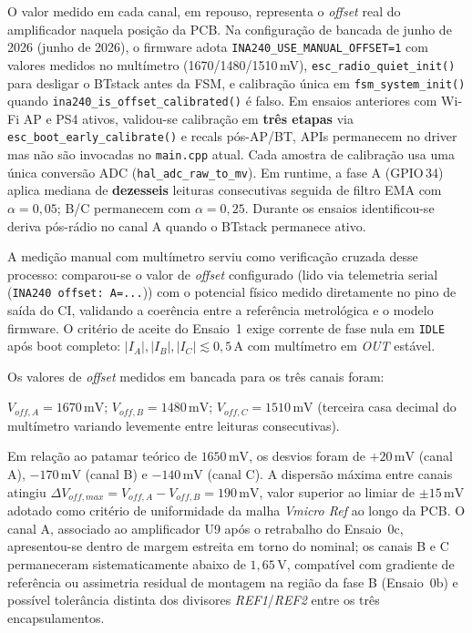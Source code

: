O valor medido em cada canal, em repouso, representa o \textit{offset} real do amplificador naquela posição da PCB. Na configuração de bancada de junho de 2026 (junho de 2026), o firmware adota \texttt{INA240\_USE\_MANUAL\_OFFSET=1} com valores medidos no multímetro (1670/1480/1510\,mV), \texttt{esc\_radio\_quiet\_init()} para desligar o BTstack antes da FSM, e calibração única em \texttt{fsm\_system\_init()} quando \texttt{ina240\_is\_offset\_calibrated()} é falso. Em ensaios anteriores com Wi-Fi AP e PS4 ativos, validou-se calibração em \textbf{três etapas} via \texttt{esc\_boot\_early\_calibrate()} e recals pós-AP/BT, APIs permanecem no driver mas não são invocadas no \texttt{main.cpp} atual. Cada amostra de calibração usa uma única conversão ADC (\texttt{hal\_adc\_raw\_to\_mv}). Em runtime, a fase A (GPIO\,34) aplica mediana de \textbf{dezesseis} leituras consecutivas seguida de filtro EMA com $\alpha = 0{,}05$; B/C permanecem com $\alpha = 0{,}25$. Durante os ensaios identificou-se deriva pós-rádio no canal A quando o BTstack permanece ativo.

A medição manual com multímetro serviu como verificação cruzada desse processo: comparou-se o valor de \textit{offset} configurado (lido via telemetria serial (\texttt{INA240 offset: A=...})) com o potencial físico medido diretamente no pino de saída do CI, validando a coerência entre a referência metrológica e o modelo firmware. O critério de aceite do Ensaio~1 exige corrente de fase nula em \texttt{IDLE} após boot completo: $|I_A|, |I_B|, |I_C| \lesssim 0{,}5\,\text{A}$ com multímetro em \textit{OUT} estável.

Os valores de \textit{offset} medidos em bancada para os três canais foram:

$V_{off,A} = 1670\,\text{mV}$; $V_{off,B} = 1480\,\text{mV}$; $V_{off,C} = 1510\,\text{mV}$ (terceira casa decimal do multímetro variando levemente entre leituras consecutivas).

Em relação ao patamar teórico de $1650\,\text{mV}$, os desvios foram de $+20\,\text{mV}$ (canal A), $-170\,\text{mV}$ (canal B) e $-140\,\text{mV}$ (canal C). A dispersão máxima entre canais atingiu $\Delta V_{off,max} = V_{off,A} - V_{off,B} = 190\,\text{mV}$, valor superior ao limiar de $\pm 15\,\text{mV}$ adotado como critério de uniformidade da malha \textit{Vmicro Ref} ao longo da PCB. O canal A, associado ao amplificador U9 após o retrabalho do Ensaio~0c, apresentou-se dentro de margem estreita em torno do nominal; os canais B e C permaneceram sistematicamente abaixo de $1{,}65\,\text{V}$, compatível com gradiente de referência ou assimetria residual de montagem na região da fase B (Ensaio~0b) e possível tolerância distinta dos divisores \textit{REF1}/\textit{REF2} entre os três encapsulamentos.

